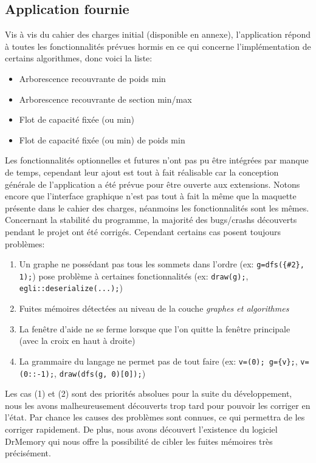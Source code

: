 \documentclass[french]{article}
\begin{document}
		\subsection{Application fournie}			
			Vis à vis du cahier des charges initial (disponible en annexe), l'application répond à toutes les fonctionnalités prévues hormis en ce qui concerne l'implémentation de certains algorithmes, donc voici la liste:
			\begin{itemize}
				\item Arborescence recouvrante de poids min
				\item Arborescence recouvrante de section min/max
				\item Flot de capacité fixée (ou min)
				\item Flot de capacité fixée (ou min) de poids min
			\end{itemize}
			Les fonctionnalités optionnelles et futures n'ont pas pu être intégrées par manque de temps, cependant leur ajout est tout à fait réalisable car la conception générale de l'application a été prévue pour être ouverte aux extensions. Notons encore que l'interface graphique n'est pas tout à fait la même que la maquette présente dans le cahier des charges, néanmoins les fonctionnalités sont les mêmes.\\
			
			Concernant la stabilité du programme, la majorité des bugs/crashs découverts pendant le projet ont été corrigés. Cependant certains cas posent toujours problèmes:
			\begin{enumerate}
				\item Un graphe ne possédant pas tous les sommets dans l'ordre (ex: \texttt{g=dfs(\{\#2\}, 1);}) pose problème à certaines fonctionnalités (ex: \texttt{draw(g);}, \texttt{egli::deserialize(...);})
				\item Fuites mémoires détectées au niveau de la couche \textit{graphes et algorithmes}
				\item La fenêtre d'aide ne se ferme lorsque que l'on quitte la fenêtre principale (avec la croix en haut à droite)
				\item La grammaire du langage ne permet pas de tout faire (ex: \texttt{v=(0); g=\{v\};}, \texttt{v=(0::-1);}, \texttt{draw(dfs(g, 0)[0]);})
			\end{enumerate}
			Les cas (1) et (2) sont des priorités absolues pour la suite du développement, nous les avons malheureusement découverts trop tard pour pouvoir les corriger en l'état. Par chance les causes des problèmes sont connues, ce qui permettra de les corriger rapidement. De plus, nous avons découvert l'existence du logiciel DrMemory \cite{drmemory} qui nous offre la possibilité de cibler les fuites mémoires très précisément.\\
			
\end{document}
